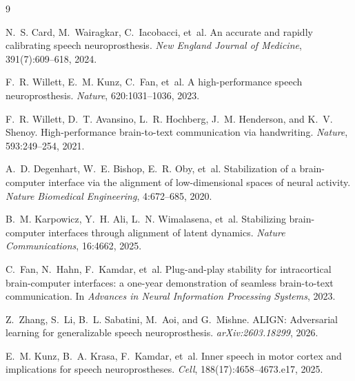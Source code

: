 \documentclass[10pt]{article}
\begin{document}
\begin{thebibliography}{9}

N.~S. Card, M.~Wairagkar, C.~Iacobacci, et~al.
\newblock An accurate and rapidly calibrating speech neuroprosthesis.
\newblock \emph{New England Journal of Medicine}, 391(7):609--618, 2024.

F.~R. Willett, E.~M. Kunz, C.~Fan, et~al.
\newblock A high-performance speech neuroprosthesis.
\newblock \emph{Nature}, 620:1031--1036, 2023.

F.~R. Willett, D.~T. Avansino, L.~R. Hochberg, J.~M. Henderson, and K.~V. Shenoy.
\newblock High-performance brain-to-text communication via handwriting.
\newblock \emph{Nature}, 593:249--254, 2021.

A.~D. Degenhart, W.~E. Bishop, E.~R. Oby, et~al.
\newblock Stabilization of a brain-computer interface via the alignment of
low-dimensional spaces of neural activity.
\newblock \emph{Nature Biomedical Engineering}, 4:672--685, 2020.

B.~M. Karpowicz, Y.~H. Ali, L.~N. Wimalasena, et~al.
\newblock Stabilizing brain-computer interfaces through alignment of latent
dynamics.
\newblock \emph{Nature Communications}, 16:4662, 2025.

C.~Fan, N.~Hahn, F.~Kamdar, et~al.
\newblock Plug-and-play stability for intracortical brain-computer interfaces:
a one-year demonstration of seamless brain-to-text communication.
\newblock In \emph{Advances in Neural Information Processing Systems}, 2023.

Z.~Zhang, S.~Li, B.~L. Sabatini, M.~Aoi, and G.~Mishne.
\newblock ALIGN: Adversarial learning for generalizable speech neuroprosthesis.
\newblock \emph{arXiv:2603.18299}, 2026.

E.~M. Kunz, B.~A. Krasa, F.~Kamdar, et~al.
\newblock Inner speech in motor cortex and implications for speech
neuroprostheses.
\newblock \emph{Cell}, 188(17):4658--4673.e17, 2025.

\end{thebibliography}
\end{document}
